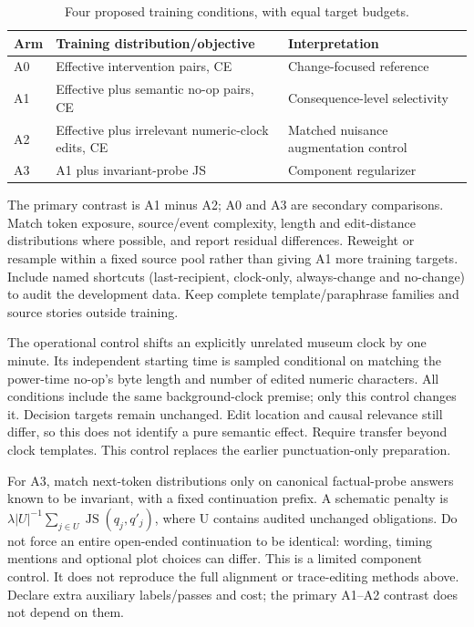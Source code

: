 \documentclass[11pt,a4paper]{article}
\begin{document}
\begin{table}[ht]\centering\small
\caption{Four proposed training conditions, with equal target budgets.}
\begin{tabularx}{\linewidth}{lYY}\toprule
Arm & Training distribution/objective & Interpretation\\\midrule
A0 & Effective intervention pairs, CE & Change-focused reference\\
A1 & Effective plus semantic no-op pairs, CE & Consequence-level selectivity\\
A2 & Effective plus irrelevant numeric-clock edits, CE & Matched nuisance augmentation control\\
A3 & A1 plus invariant-probe JS & Component regularizer\\
\bottomrule\end{tabularx}\end{table}

The primary contrast is A1 minus A2; A0 and A3 are secondary comparisons.
Match token exposure, source/event complexity, length and edit-distance
distributions where possible, and report residual differences. Reweight or
resample within a fixed source pool rather than giving A1 more training targets.
Include named shortcuts (last-recipient, clock-only, always-change and no-change)
to audit the development data. Keep complete template/paraphrase families and
source stories outside training.

The operational control shifts an explicitly unrelated museum clock by one
minute. Its independent starting time is sampled conditional on matching the
power-time no-op's byte length and number of edited numeric characters. All
conditions include the same background-clock premise; only this control changes
it. Decision targets remain unchanged. Edit location and causal relevance still
differ, so this does not identify a pure semantic effect. Require transfer beyond
clock templates. This control replaces the earlier punctuation-only preparation.

For A3, match next-token distributions only on canonical factual-probe answers
known to be invariant, with a fixed continuation prefix. A schematic penalty is
\(\lambda |U|^{-1}\sum_{j\in U}\operatorname{JS}(q_j,q'_j)\), where U contains
audited unchanged obligations. Do not force an entire open-ended continuation
to be identical: wording, timing mentions and optional plot choices can differ.
This is a limited component control. It does not reproduce the full alignment
or trace-editing methods above. Declare extra auxiliary labels/passes and cost;
the primary A1--A2 contrast does not depend on them.
\end{document}
